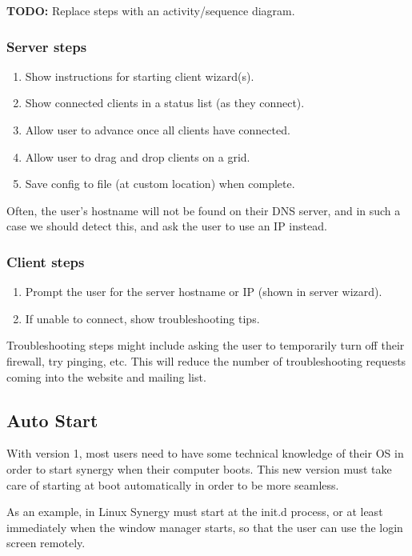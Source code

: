 \textbf{TODO:} Replace steps with an activity/sequence diagram.

\subsubsection{Server steps}
\begin{enumerate}
  \item Show instructions for starting client wizard(s).
  \item Show connected clients in a status list (as they connect).
  \item Allow user to advance once all clients have connected.
  \item Allow user to drag and drop clients on a grid.
  \item Save config to file (at custom location) when complete.
\end{enumerate}

Often, the user's hostname will not be found on their DNS server, and in such
a case we should detect this, and ask the user to use an IP instead.

\subsubsection{Client steps}
\begin{enumerate}
  \item Prompt the user for the server hostname or IP (shown in server wizard).
  \item If unable to connect, show troubleshooting tips.
\end{enumerate}

Troubleshooting steps might include asking the user to temporarily turn off
their firewall, try pinging, etc. This will reduce the number of troubleshooting
requests coming into the website and mailing list.

\subsection{Auto Start}

With version 1, most users need to have some technical knowledge of their OS
in order to start synergy when their computer boots. This new version must
take care of starting at boot automatically in order to be more seamless.

As an example, in Linux Synergy 
must start at the init.d process, or at least immediately when the window 
manager starts, so that the user can use the login screen remotely.

